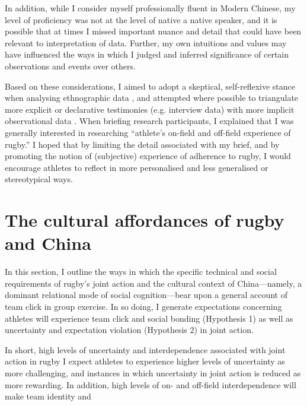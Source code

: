 \begin{CJK}{UTF8}{gbsn}
In addition, while I consider myself professionally fluent in Modern Chinese, my level of proficiency was not at the level of native a native speaker, and it is possible that at times I missed important nuance and detail that could have been relevant to interpretation of data. Further, my own intuitions and values may have influenced the ways in which I judged and inferred significance of certain observations and  events over others.

Based on these considerations, I aimed to adopt a skeptical, self-reflexive stance when analysing ethnographic data \citep{Lichterman2017}, and attempted where possible to triangulate more explicit or declarative testimonies (e.g. interview data) with more implicit observational data \citep[see, for example:][]{Duffy1987}.
When briefing research participants, I explained that I was generally interested in researching ``athlete's on-field and off-field experience of rugby.'' I hoped that by limiting the detail associated with my brief, and by promoting the notion of (subjective) experience of adherence to rugby, I would encourage athletes to reflect in more personalised and less generalised or stereotypical ways.








\section{The cultural affordances of rugby and China}


In this section, I outline the ways in which the specific technical and social requirements of rugby's joint action and the cultural context of China---namely, a dominant relational mode of social cognition---bear upon a general account of team click in group exercise.  In so doing, I generate expectations concerning athletes will experience team click and social bonding (Hypothesis 1) as well as uncertainty and expectation violation (Hypothesis 2) in joint action.

In short, high levels of uncertainty and interdependence associated with joint action in rugby I expect athletes to experience higher levels of uncertainty as more challenging, and instances in which uncertainty in joint action is reduced as more rewarding.  In addition, high levels of on- and off-field interdependence will make team identity and


\end{CJK}
